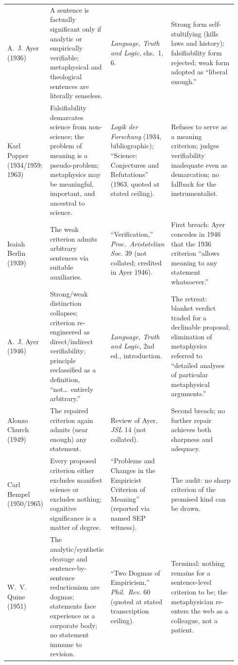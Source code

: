 \begin{longtable}{>{\raggedright\arraybackslash}p{0.135\linewidth}>{\raggedright\arraybackslash}p{0.265\linewidth}>{\raggedright\arraybackslash}p{0.24\linewidth}>{\raggedright\arraybackslash}p{0.30\linewidth}}
A.~J. Ayer (1936) & A sentence is factually significant only if analytic or empirically verifiable; metaphysical and theological sentences are literally senseless. & \emph{Language, Truth and Logic}, chs.~1, 6. & Strong form self-stultifying (kills laws and history); falsifiability form rejected; weak form adopted as ``liberal enough.''\\
Karl Popper (1934/1959; 1963) & Falsifiability demarcates science from non-science; the problem of meaning is a pseudo-problem; metaphysics may be meaningful, important, and ancestral to science. & \emph{Logik der Forschung} (1934, bibliographic); ``Science: Conjectures and Refutations'' (1963, quoted at stated ceiling). & Refuses to serve as a meaning criterion; judges verifiability inadequate even as demarcation; no fallback for the instrumentalist.\\
Isaiah Berlin (1939) & The weak criterion admits arbitrary sentences via suitable auxiliaries. & ``Verification,'' \emph{Proc.\ Aristotelian Soc.} 39 (not collated; credited in Ayer 1946). & First breach: Ayer concedes in 1946 that the 1936 criterion ``allows meaning to any statement whatsoever.''\\
A.~J. Ayer (1946) & Strong/weak distinction collapses; criterion re-engineered as direct/indirect verifiability; principle reclassified as a definition, ``not\ldots\ entirely arbitrary.'' & \emph{Language, Truth and Logic}, 2nd ed., introduction. & The retreat: blanket verdict traded for a declinable proposal; elimination of metaphysics referred to ``detailed analyses of particular metaphysical arguments.''\\
Alonzo Church (1949) & The repaired criterion again admits (near enough) any statement. & Review of Ayer, \emph{JSL} 14 (not collated). & Second breach; no further repair achieves both sharpness and adequacy.\\
Carl Hempel (1950/1965) & Every proposed criterion either excludes manifest science or excludes nothing; cognitive significance is a matter of degree. & ``Problems and Changes in the Empiricist Criterion of Meaning'' (reported via named SEP witness). & The audit: no sharp criterion of the promised kind can be drawn.\\
W.~V. Quine (1951) & The analytic/synthetic cleavage and sentence-by-sentence reductionism are dogmas; statements face experience as a corporate body; no statement immune to revision. & ``Two Dogmas of Empiricism,'' \emph{Phil.\ Rev.} 60 (quoted at stated transcription ceiling). & Terminal: nothing remains for a sentence-level criterion to be; the metaphysician re-enters the web as a colleague, not a patient.\\

\end{longtable}
